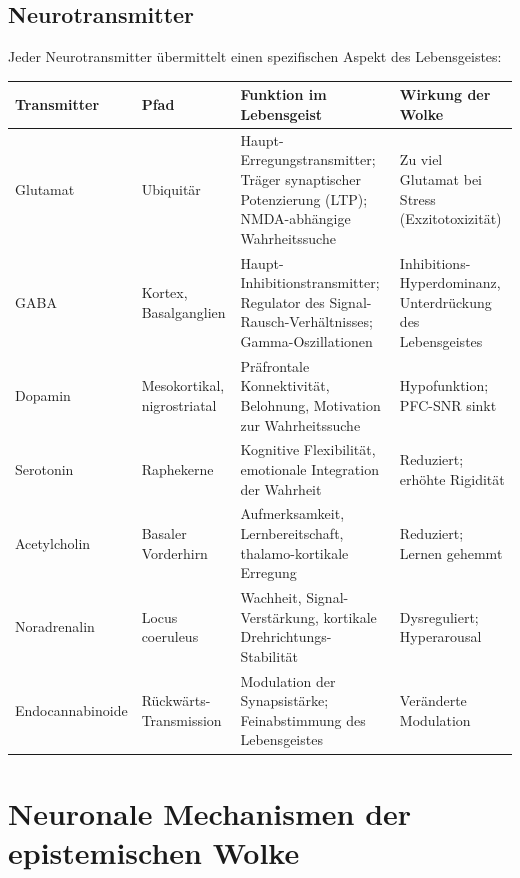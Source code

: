 ﻿\documentclass[12pt,a4paper]{report}
\theoremstyle{plain}
\theoremstyle{definition}
\theoremstyle{remark}
\begin{document}
	\section{Neurotransmitter}
	
	Jeder Neurotransmitter übermittelt einen spezifischen Aspekt des Lebensgeistes:
	
	\begin{longtable}{@{}p{2.8cm}p{2.2cm}p{5.8cm}p{3.5cm}@{}}
		\toprule
		\textbf{Transmitter} & \textbf{Pfad} & \textbf{Funktion im Lebensgeist} & \textbf{Wirkung der Wolke}\\
		\midrule
		Glutamat & Ubiquitär & Haupt-Erregungstransmitter; Träger synaptischer Potenzierung (LTP); NMDA-abhängige Wahrheitssuche & Zu viel Glutamat bei Stress (Exzitotoxizität)\\[4pt]
		GABA & Kortex, Basalganglien & Haupt-Inhibitionstransmitter; Regulator des Signal-Rausch-Verhältnisses; Gamma-Oszillationen & Inhibitions-Hyperdominanz, Unterdrückung des Lebensgeistes\\[4pt]
		Dopamin & Mesokortikal, nigrostriatal & Präfrontale Konnektivität, Belohnung, Motivation zur Wahrheitssuche & Hypofunktion; PFC-SNR sinkt\\[4pt]
		Serotonin & Raphekerne & Kognitive Flexibilität, emotionale Integration der Wahrheit & Reduziert; erhöhte Rigidität\\[4pt]
		Acetylcholin & Basaler Vorderhirn & Aufmerksamkeit, Lernbereitschaft, thalamo-kortikale Erregung & Reduziert; Lernen gehemmt\\[4pt]
		Noradrenalin & Locus coeruleus & Wachheit, Signal-Verstärkung, kortikale Drehrichtungs-Stabilität & Dysreguliert; Hyperarousal\\[4pt]
		Endocannabinoide & Rückwärts-Transmission & Modulation der Synapsistärke; Feinabstimmung des Lebensgeistes & Veränderte Modulation\\
		\bottomrule
	\end{longtable}
	
	\chapter{Neuronale Mechanismen der epistemischen Wolke}
	
\end{document}
